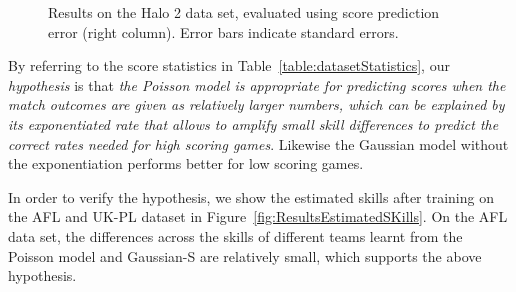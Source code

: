 \begin{center}
\begin{figure*}[t!]
 \centering
\caption{\small Results on the Halo 2 data set, evaluated using score
prediction error (right column). Error bars indicate
standard errors.}
\label{fig:ScoreError_Halo}
\end{figure*}
\end{center}


\COMMENT
By referring to the score
statistics in Table~\ref{table:datasetStatistics}, our {\it
hypothesis} is that {\it the Poisson model is appropriate for
predicting scores when the match outcomes are given as relatively
larger numbers, which can be explained by its exponentiated rate that
allows to amplify small skill differences to predict the correct rates
needed for high scoring games}. Likewise the Gaussian model without
the exponentiation performs better for low scoring games.

In order to verify the hypothesis, we show the estimated skills after
training on the AFL and UK-PL dataset in
Figure~\ref{fig:ResultsEstimatedSKills}. On the AFL data set, the
differences across the skills of different teams learnt from the
Poisson model and Gaussian-S are relatively small, which supports the
above hypothesis.

\ENDCOMMENT

